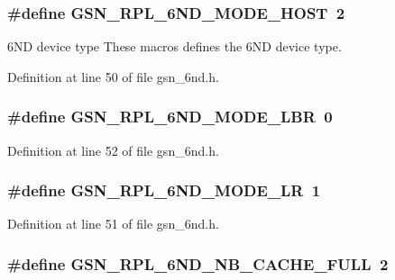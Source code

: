 \hypertarget{a00473_a189e6e0e1158b69710738801abe2bcbd}{
\subsubsection[{GSN\_\-RPL\_\-6ND\_\-MODE\_\-HOST}]{\setlength{\rightskip}{0pt plus 5cm}\#define GSN\_\-RPL\_\-6ND\_\-MODE\_\-HOST~2}}
\label{a00473_a189e6e0e1158b69710738801abe2bcbd}


6ND device type These macros defines the 6ND device type. 



Definition at line 50 of file gsn\_\-6nd.h.

\hypertarget{a00473_aa4574cefa86dc0bb763c7a4125767ba1}{
\subsubsection[{GSN\_\-RPL\_\-6ND\_\-MODE\_\-LBR}]{\setlength{\rightskip}{0pt plus 5cm}\#define GSN\_\-RPL\_\-6ND\_\-MODE\_\-LBR~0}}
\label{a00473_aa4574cefa86dc0bb763c7a4125767ba1}


Definition at line 52 of file gsn\_\-6nd.h.

\hypertarget{a00473_a53a1539675f4ce93068d86f3e7b1ea64}{
\subsubsection[{GSN\_\-RPL\_\-6ND\_\-MODE\_\-LR}]{\setlength{\rightskip}{0pt plus 5cm}\#define GSN\_\-RPL\_\-6ND\_\-MODE\_\-LR~1}}
\label{a00473_a53a1539675f4ce93068d86f3e7b1ea64}


Definition at line 51 of file gsn\_\-6nd.h.

\hypertarget{a00473_a7b5b4e73b0e9ff9bc15c9ddef8356b25}{
\subsubsection[{GSN\_\-RPL\_\-6ND\_\-NB\_\-CACHE\_\-FULL}]{\setlength{\rightskip}{0pt plus 5cm}\#define GSN\_\-RPL\_\-6ND\_\-NB\_\-CACHE\_\-FULL~2}}
\label{a00473_a7b5b4e73b0e9ff9bc15c9ddef8356b25}


